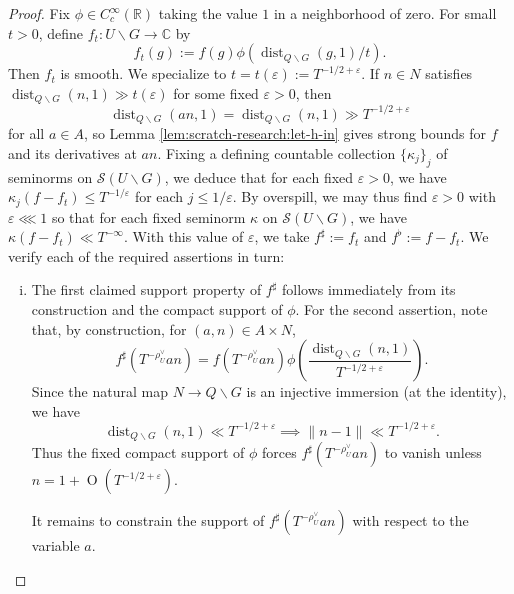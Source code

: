\documentclass[reqno]{amsart}
\def\eps{\varepsilon}
\DeclareMathOperator{\dist}{dist}
\def\O{\operatorname{O}}
\theoremstyle{plain} \newtheorem{theorem} {Theorem}
\theoremstyle{definition} \newtheorem{definition} [theorem] {Definition}
\theoremstyle{itplain} %
\numberwithin{equation}{section}
\numberwithin{theorem}{section}
\renewcommand{\leq}{\leqslant}
\begin{document}
\begin{proof}
  Fix $\phi \in C_c^\infty(\mathbb{R})$ taking the value $1$ in a neighborhood of zero.  For small $t > 0$, define $f_t : U \backslash G \rightarrow \mathbb{C}$ by
  \begin{equation*}
    f_t(g) :=
    f(g) \phi (\dist_{Q \backslash G}(g,1) / t).
  \end{equation*}
  Then $f_t$ is smooth.  We specialize to $t = t(\eps) := T^{-1/2+\eps}$.  If $n \in N$ satisfies $\dist_{Q \backslash G}(n,1) \gg t(\eps)$ for some fixed $\eps > 0$, then
  \begin{equation*}
\dist_{Q \backslash G}(a n,1) = \dist_{Q \backslash G}(n, 1) \gg T^{-1/2+\eps}
\end{equation*}
for all $a \in A$, so Lemma \ref{lem:scratch-research:let-h-in} gives strong bounds for $f$ and its derivatives at $a n$.  Fixing a defining countable collection $\{\kappa_j\}_j$ of seminorms on $\mathcal{S}(U \backslash G)$, we deduce that for each fixed $\eps > 0$, we have $\kappa_j(f - f_t) \leq T^{-1/\eps}$ for each $j \leq 1/\eps$.  By overspill, we may thus find $\eps > 0$ with $\eps \lll 1$ so that for each fixed seminorm $\kappa$ on $\mathcal{S}(U \backslash G)$, we have $\kappa(f - f_t) \ll T^{-\infty}$.  With this value of $\eps$, we take $f^{\sharp} := f_t$ and $f ^\flat := f - f_t$.  We verify each of the required assertions in turn:
  \begin{enumerate}[(i)]
  \item The first claimed support property of $f ^\sharp $ follows immediately from its construction and the compact support of $\phi$.  For the second assertion, note that, by construction, for $(a,n) \in A \times N$,
    \begin{equation}\label{eq:f-sharp-t}
      f ^\sharp (T^{-\rho_U^\vee} a n) = f( T^{-\rho_U^\vee} a n) \phi\left(\frac{\dist_{Q \backslash G}(n,1) }{ T^{-1/2+\eps}}\right).
    \end{equation}
    Since the natural map $N \rightarrow Q \backslash G$ is an injective immersion (at the identity), we have
    \begin{equation*}
      \dist_{Q \backslash G} (n,1) \ll T^{-1/2+\eps} \implies \|n - 1\| \ll T^{-1/2 + \eps}.
    \end{equation*}
    Thus the fixed compact support of $\phi$ forces $f ^\sharp (T ^{- \rho _U ^\vee } a n )$ to vanish unless $n = 1 + \O(T^{-1/2+\eps})$.

    It remains to constrain the support of $f ^\sharp (T ^{- \rho _U ^\vee } a n)$ with respect to the variable $a$.


\end{enumerate}
\end{proof}
\end{document}
